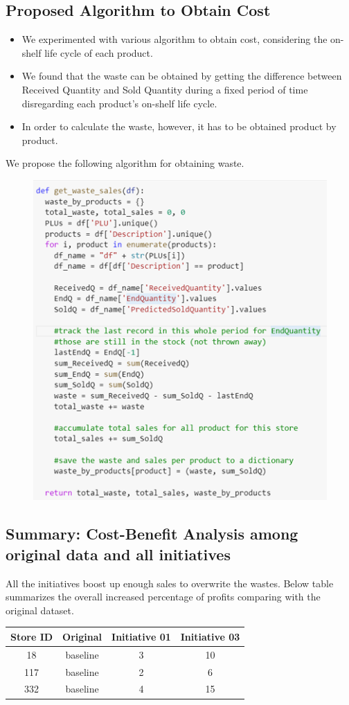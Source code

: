\subsection{Proposed Algorithm to Obtain Cost}
\begin{itemize}
    \item We experimented with various algorithm to obtain cost, considering the on-shelf life cycle of each product.
    \item We found that the waste can be obtained by getting the difference between Received Quantity and Sold Quantity during a fixed period of time disregarding each product's on-shelf life cycle. 
    \item In order to calculate the waste, however, it has to be obtained product by product. 
\end{itemize}

We propose the following algorithm for obtaining waste.
\begin{figure}[ht]
    \centering
    \includegraphics[width = 0.56\linewidth]{figures/algorithm.png}
\end{figure}

\subsection{Summary: Cost-Benefit Analysis among original data and all initiatives}
All the initiatives boost up enough sales to overwrite the wastes. Below table summarizes the overall increased percentage of profits comparing with the original dataset.


\begin{center}
\begin{tabular}{||c c c c||} 
 \hline
 Store ID & Original & Initiative 01 & Initiative 03\\ [0.7ex] 
 \hline\hline
 18 & baseline & 3 & 10\\ 
 \hline
 117 & baseline & 2 & 6 \\
 \hline
 332 & baseline & 4 & 15 \\ [1ex] 
 \hline
\end{tabular}
\end{center}

